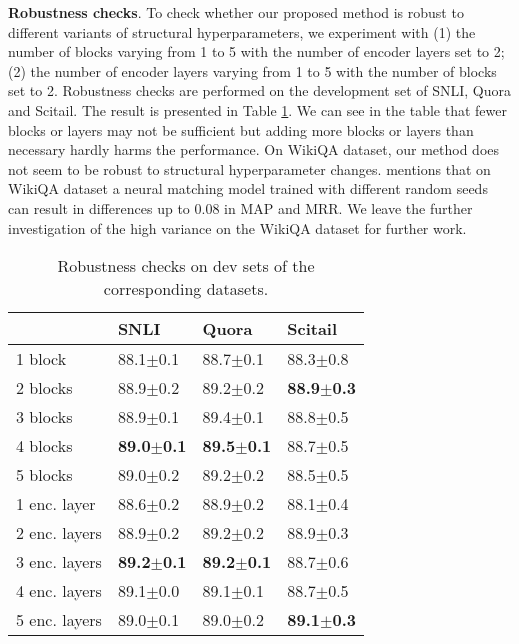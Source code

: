 \documentclass[11pt,a4paper]{article}
\begin{document}
{\bf Robustness checks}. To check whether our proposed method is robust to different variants of structural hyperparameters, we experiment with (1) the number of blocks varying from 1 to 5 with the number of encoder layers set to 2; (2) the number of encoder layers varying from 1 to 5 with the number of blocks set to 2. Robustness checks are performed on the development set of SNLI, Quora and Scitail. The result is presented in Table \ref{tab:robustness}. We can see in the table that fewer blocks or layers may not be sufficient but adding more blocks or layers than necessary hardly harms the performance. 
On WikiQA dataset, our method does not seem to be robust to structural hyperparameter changes. \citeauthor{crane2018questionable}  mentions that on WikiQA dataset a neural matching model \cite{severyn2015learning} trained with different random seeds can result in differences up to 0.08 in MAP and MRR. We leave the further investigation of the high variance on the WikiQA dataset for further work.

\begin{table}
  \centering
  \small
  \begin{tabular}{|l|l|l|l|}
  \hline
    & {\bf SNLI} & {\bf Quora} & {\bf Scitail} \\\hline
  1 block & 88.1$\pm$0.1       & 88.7$\pm$0.1       & 88.3$\pm$0.8        \\
  2 blocks & 88.9$\pm$0.2       & 89.2$\pm$0.2       & {\bf 88.9$\pm$0.3}  \\
  3 blocks & 88.9$\pm$0.1       & 89.4$\pm$0.1       & 88.8$\pm$0.5        \\
  4 blocks & {\bf 89.0$\pm$0.1} & {\bf 89.5$\pm$0.1} & 88.7$\pm$0.5        \\
  5 blocks & 89.0$\pm$0.2       & 89.2$\pm$0.2       & 88.5$\pm$0.5        \\\hline
  1 enc. layer & 88.6$\pm$0.2       & 88.9$\pm$0.2       & 88.1$\pm$0.4       \\
  2 enc. layers & 88.9$\pm$0.2       & 89.2$\pm$0.2       & 88.9$\pm$0.3       \\
  3 enc. layers & {\bf 89.2$\pm$0.1} & {\bf 89.2$\pm$0.1} & 88.7$\pm$0.6       \\
  4 enc. layers & 89.1$\pm$0.0       & 89.1$\pm$0.1       & 88.7$\pm$0.5       \\
  5 enc. layers & 89.0$\pm$0.1       & 89.0$\pm$0.2       & {\bf 89.1$\pm$0.3} \\\hline
  \end{tabular}
  \caption{Robustness checks on dev sets of the corresponding datasets.}
  \label{tab:robustness}
\end{table}
\end{document}
